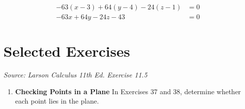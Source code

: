 \vspace{-3.5em}
\begin{align*}
    -63(x - 3) + 64(y - 4) - 24(z - 1) & = 0 \\
    -63x + 64y - 24z - 43              & = 0
\end{align*}

\newpage

\section*{Selected Exercises}

\textit{Source: Larson Calculus 11th Ed. Exercise 11.5}

\begin{enumerate}[label={},leftmargin=*]
    \item \textbf{Checking Points in a Plane} In Exercises 37 and 38, determine whether each point
          lies in the plane.
\end{enumerate}

